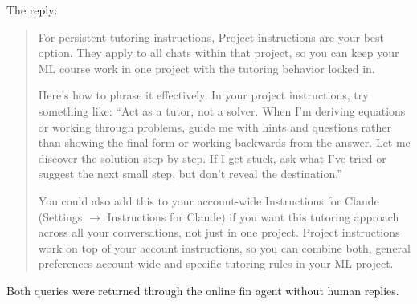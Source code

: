 \begin{answer}
  The reply:

  \begin{quote}
  For persistent tutoring instructions, Project instructions are your best option. They apply to all
  chats within that project, so you can keep your ML course work in one project with the tutoring
  behavior locked in.

  Here's how to phrase it effectively. In your project instructions, try something like: ``Act as a
  tutor, not a solver. When I'm deriving equations or working through problems, guide me with hints
  and questions rather than showing the final form or working backwards from the answer. Let me
  discover the solution step-by-step. If I get stuck, ask what I've tried or suggest the next small
  step, but don't reveal the destination.''

  You could also add this to your account-wide Instructions for Claude (Settings $\rightarrow$
  Instructions for Claude) if you want this tutoring approach across all your conversations, not
  just in one project. Project instructions work on top of your account instructions, so you can
  combine both, general preferences account-wide and specific tutoring rules in your ML project.
  \end{quote}

  Both queries were returned through the online fin agent without human replies.
\end{answer}
\clearpage


